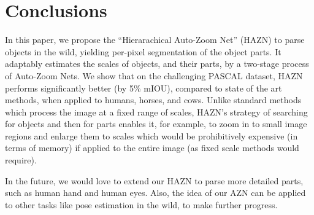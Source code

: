 \documentclass[runningheads]{llncs}
\begin{document}
\vspace{-1.5\baselineskip}
\section{Conclusions}
\vspace{-0.7\baselineskip}
In this paper, we propose the ``Hierarachical Auto-Zoom Net'' (HAZN) to parse objects in the wild, yielding per-pixel segmentation of the object parts. It adaptably estimates the scales of objects, and their parts, by a two-stage process of Auto-Zoom Nets. We show that on the challenging PASCAL dataset, HAZN performs significantly better (by 5\% mIOU), compared to state of the art methods, when applied to humans, horses, and cows. Unlike standard methods which process the image at a fixed range of scales, HAZN's strategy of searching for objects and then for parts enables it, for example, to zoom in to small image regions and enlarge them to scales which would be prohibitively expensive (in terms of memory) if applied to the entire image (as fixed scale methods would require).

In the future, we would love to extend our HAZN to parse more detailed parts, such as human hand and human eyes. Also, the idea of our AZN can be applied to other tasks like pose estimation in the wild, to make further progress.




{


}
\end{document}

